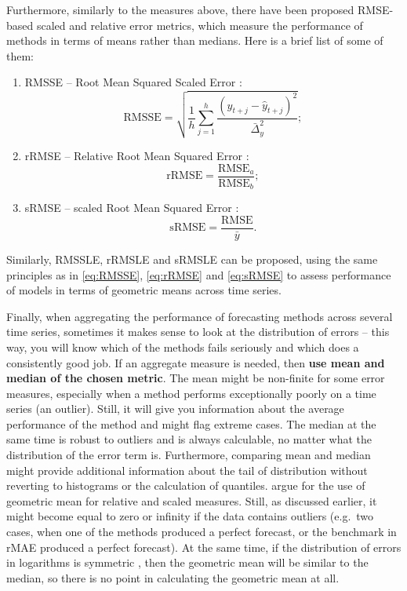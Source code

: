 \documentclass[]{book}
\providecommand{\tightlist}{%
  \setlength{\itemsep}{0pt}\setlength{\parskip}{0pt}}
\theoremstyle{definition}
\theoremstyle{definition}
\theoremstyle{definition}
\theoremstyle{definition}
\theoremstyle{remark}
\begin{document}
Furthermore, similarly to the measures above, there have been proposed RMSE-based scaled and relative error metrics, which measure the performance of methods in terms of means rather than medians. Here is a brief list of some of them:

\begin{enumerate}
\def\labelenumi{\arabic{enumi}.}
\tightlist
\item
  RMSSE -- Root Mean Squared Scaled Error \citep{Makridakis2020a}:
  \begin{equation}
   \mathrm{RMSSE} = \sqrt{\frac{1}{h} \sum_{j=1}^h \frac{(y_{t+j} -\hat{y}_{t+j})^2}{\bar{\Delta}_y^2}} ;
   \label{eq:RMSSE}
  \end{equation}
\item
  rRMSE -- Relative Root Mean Squared Error \citep{Stock2004}:
  \begin{equation}
   \mathrm{rRMSE} = \frac{\mathrm{RMSE}_a}{\mathrm{RMSE}_b} ;
   \label{eq:rRMSE}
  \end{equation}
\item
  sRMSE -- scaled Root Mean Squared Error \citep{Petropoulos2015}:
  \begin{equation}
   \mathrm{sRMSE} = \frac{\mathrm{RMSE}}{\bar{y}} .
   \label{eq:sRMSE}
  \end{equation}
\end{enumerate}

Similarly, RMSSLE, rRMSLE and sRMSLE can be proposed, using the same principles as in \eqref{eq:RMSSE}, \eqref{eq:rRMSE} and \eqref{eq:sRMSE} to assess performance of models in terms of geometric means across time series.

Finally, when aggregating the performance of forecasting methods across several time series, sometimes it makes sense to look at the distribution of errors -- this way, you will know which of the methods fails seriously and which does a consistently good job. If an aggregate measure is needed, then \textbf{use mean and median of the chosen metric}. The mean might be non-finite for some error measures, especially when a method performs exceptionally poorly on a time series (an outlier). Still, it will give you information about the average performance of the method and might flag extreme cases. The median at the same time is robust to outliers and is always calculable, no matter what the distribution of the error term is. Furthermore, comparing mean and median might provide additional information about the tail of distribution without reverting to histograms or the calculation of quantiles. \citet{Davydenko2013} argue for the use of geometric mean for relative and scaled measures. Still, as discussed earlier, it might become equal to zero or infinity if the data contains outliers (e.g.~two cases, when one of the methods produced a perfect forecast, or the benchmark in rMAE produced a perfect forecast). At the same time, if the distribution of errors in logarithms is symmetric \citep[which is the main argument of][]{Davydenko2013}, then the geometric mean will be similar to the median, so there is no point in calculating the geometric mean at all.
\end{document}
